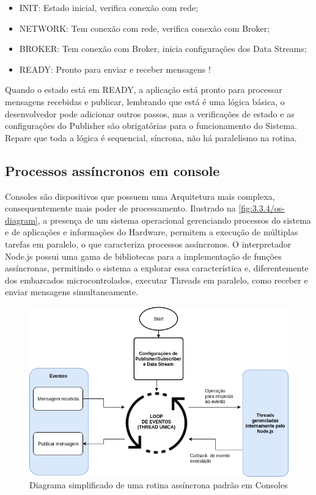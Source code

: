 \begin{itemize}
\item INIT: Estado inicial, verifica conexão com rede;
\item NETWORK: Tem conexão com rede, verifica conexão com Broker;
\item BROKER: Tem conexão com Broker, inicia configurações dos Data Streams;
\item READY: Pronto para enviar e receber mensagens !
\end{itemize}

Quando o estado está em READY, a aplicação está pronto para processar mensagens recebidas e publicar, lembrando que está é uma lógica básica, o desenvolvedor pode adicionar outros passos, mas a verificações de estado e as configurações do Publisher são obrigatórias para o funcionamento do Sistema. Repare que toda a lógica é sequencial, síncrona, não há paralelismo na rotina.

\subsection{Processos assíncronos em console}
\label{subsection:consoles_assinc}

Consoles são dispositivos que possuem uma Arquitetura mais complexa, consequentemente mais poder de processamento. Ilustrado na  \ref{fig:3.3.4/os-diagram}, a presença de um sistema operacional gerenciando processos do sistema e de aplicações e informações do Hardware, permitem a execução de múltiplas tarefas em paralelo, o que caracteriza processos assíncronos. O interpretador Node.js possui uma gama de bibliotecas para a implementação de funções assíncronas, permitindo o sistema a explorar essa característica e, diferentemente dos embarcados microcontrolados, executar Threads em paralelo, como receber e enviar mensagens simultaneamente.


\begin{figure}[h!]
\centering
\includegraphics[width=13cm]{./02_Capitulos/02_Cap3/figures/async-implementation}
\caption{Diagrama simplificado de uma rotina assíncrona padrão em Consoles}
\label{fig:async-implementation}
\end{figure}

